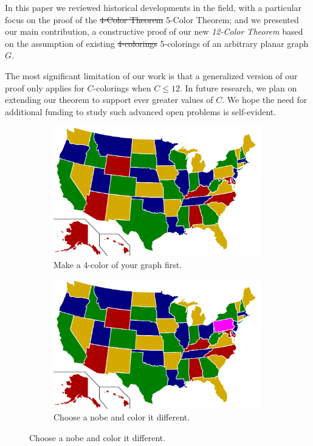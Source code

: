 \documentclass{article}
\begin{document}
In this paper we reviewed historical developments in the field, with a particular focus on the proof of the \sout{4-Color Theorem} 5-Color Theorem; and we presented our main contribution, a constructive proof of our new \textit{12-Color Theorem} based on the assumption of existing \sout{4-colorings} 5-colorings of an arbitrary planar graph $G$.

The most significant limitation of our work is that a generalized version of our proof only applies for $C$-colorings when $C \le 12$. In future research, we plan on extending our theorem to support ever greater values of $C$. We hope the need for additional funding to study such advanced open problems is self-evident.

\newpage

\thispagestyle{empty}

\begin{figure}
	\centering
	\begin{subfigure}[b]{0.45\textwidth}
	\includegraphics[width=\textwidth]{4color.pdf}
	\caption{Make a 4-color of your graph first. \\ {}}
	\end{subfigure}
	\quad
	\begin{subfigure}[b]{0.45\textwidth}
	\includegraphics[width=\textwidth]{5color.pdf}
	\caption{Choose a nobe and color it different.}
	\end{subfigure}


\end{figure}
\end{document}
